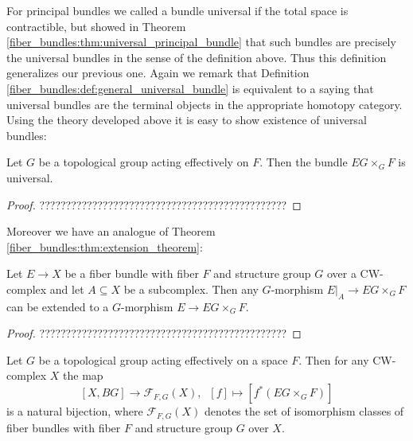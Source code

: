 For principal bundles we called a bundle universal if the total space is contractible, but showed in Theorem \ref{fiber_bundles:thm:universal_principal_bundle} that such bundles are precisely the universal bundles in the sense of the definition above. Thus this definition generalizes our previous one. Again we remark that Definition \ref{fiber_bundles:def:general_universal_bundle} is equivalent to a saying that universal bundles are the terminal objects in the appropriate homotopy category. Using the theory developed above it is easy to show existence of universal bundles:

\begin{theorem}
    \label{fiber_bundles:thm:existence_of_general_universal_bundles}
    Let $G$ be a topological group acting effectively on $F$. Then the bundle $EG \times_G F$ is universal.
\end{theorem}

\begin{proof}
    ???????????????????????????????????????????????
\end{proof}

Moreover we have an analogue of Theorem \ref{fiber_bundles:thm:extension_theorem}:

\begin{theorem}
    Let $E \to X$ be a fiber bundle with fiber $F$ and structure group $G$ over a CW-complex and let $A \subseteq X$ be a subcomplex. Then any $G$-morphism $E|_A \to EG \times_G F$ can be extended to a $G$-morphism $E \to EG \times_G F$. 
\end{theorem}

\begin{proof}
    ???????????????????????????????????????????????
\end{proof}

\begin{corollary}
    Let $G$ be a topological group acting effectively on a space $F$. Then for any CW-complex $X$ the map 
    \[
    [X,BG] \to \mathcal{F}_{F,G}(X), \; \; [f] \mapsto \left[f^\ast(EG \times_G F)\right]
    \]
    is a natural bijection, where $\mathcal{F}_{F,G}(X)$ denotes the set of isomorphism classes of fiber bundles with fiber $F$ and structure group $G$ over $X$.
\end{corollary}


